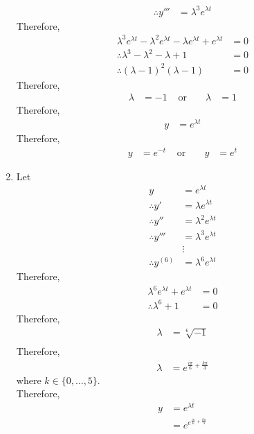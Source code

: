 \documentclass[fleqn, a4paper, 11pt, oneside]{amsart}
\theoremstyle{definition}
\theoremstyle{theorem}
\begin{document}
\begin{solution}
\begin{enumerate}[leftmargin = *]
\begin{align*}
				\therefore y''' & = \lambda^3 e^{\lambda t}
			\end{align*}
			Therefore,
			\begin{align*}
				\lambda^3 e^{\lambda t} - \lambda^2 e^{\lambda t} - \lambda e^{\lambda t} + e^{\lambda t} & = 0 \\
				\therefore \lambda^3 - \lambda^2 - \lambda + 1                                            & = 0 \\
				\therefore (\lambda - 1)^2 (\lambda - 1)                                                  & = 0
			\end{align*}
			Therefore,
			\begin{align*}
				\lambda & = -1 & \text{ or } &  & \lambda & = 1
			\end{align*}
			Therefore,
			\begin{align*}
				y & = e^{\lambda t}
			\end{align*}
			Therefore,
			\begin{align*}
				y & = e^{-t} & \text{ or } &  & y & = e^{t}
			\end{align*}
		\item
			Let
			\begin{align*}
				y                  & = e^{\lambda t}           \\
				\therefore y'      & = \lambda e^{\lambda t}   \\
				\therefore y''     & = \lambda^2 e^{\lambda t} \\
				\therefore y'''    & = \lambda^3 e^{\lambda t} \\
                                                   & \vdots                    \\
				\therefore y^{(6)} & = \lambda^6 e^{\lambda t}
			\end{align*}
			Therefore,
			\begin{align*}
				\lambda^6 e^{\lambda t} + e^{\lambda t} & = 0 \\
				\therefore \lambda^6 + 1                & = 0
			\end{align*}
			Therefore,
			\begin{align*}
				\lambda & = \sqrt[6]{-1} \\
			\end{align*}
			Therefore,
			\begin{align*}
				\lambda & = e^{\frac{i \pi}{6} + \frac{k \pi}{3}}
			\end{align*}
			where $k \in \{0,\dots,5\}$.\\
			Therefore,
			\begin{align*}
				y & = e^{\lambda t} \\
                                  & = e^{e^{\frac{i \pi}{6} + \frac{k \pi}{3}}}
			\end{align*}
	\end{enumerate}
\end{solution}
\end{document}
